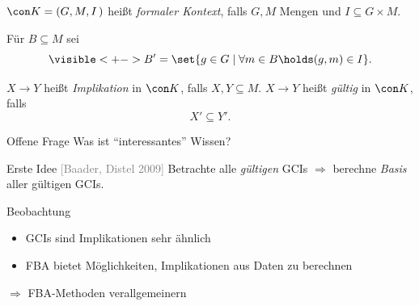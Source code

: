 \documentclass[ngerman]{beamer}
\newcommand{\pseudocite}[1]{\textcolor{gray}{[#1]}}
\begin{document}
\begin{frame}

  \onslide<+->
  
  \begin{Definition}
    $\con K = (G, M, I\,)$ heißt \emph{formaler Kontext}, falls $G, M$ Mengen und $I
    \subseteq G \times M$.

    \onslide<+->\medskip

    Für $B \subseteq M$ sei
    \begin{equation*}
      \visible<+->{B' = \set{ g \in G \mid \forall m \in B \holds (g, m) \in I }.}
    \end{equation*}
  \end{Definition}
  \vspace*{-\baselineskip}
  
  \onslide<+->

  \begin{Definition}
    $X \to Y$ heißt \emph{Implikation} in $\con K$, falls $X, Y \subseteq M$. \onslide<+->
    $X \to Y$ heißt \emph{gültig} in $\con K$, falls
    \begin{equation*}
      X' \subseteq Y'.
    \end{equation*}
  \end{Definition}
  
\end{frame}

\begin{frame}

  \onslide<+->

  \begin{block}{Offene Frage}
    Was ist \enquote{interessantes} Wissen?
  \end{block}

  \onslide<+->

  \begin{block}{Erste Idee \pseudocite{Baader, Distel 2009}}
    \onslide<+->
    Betrachte alle \emph{gültigen} GCIs \onslide<+-> $\Longrightarrow$ berechne
    \emph{Basis} aller gültigen GCIs.
  \end{block}

  \onslide<+->

  \begin{block}{Beobachtung}
    \begin{itemize}
    \item<+-> GCIs sind Implikationen sehr ähnlich
    \item<+-> FBA bietet Möglichkeiten, Implikationen aus Daten zu berechnen
    \end{itemize}
    \onslide<+->%
    $\Longrightarrow$ FBA-Methoden verallgemeinern
  \end{block}

\end{frame}
\end{document}
